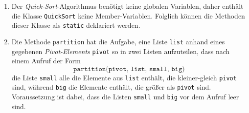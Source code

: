 \begin{enumerate}
\item Der \emph{Quick-Sort}-Algorithmus ben\"otigt keine globalen Variablen,
      daher enth\"alt die Klasse \texttt{QuickSort} keine Member-Variablen.
      Folglich k\"onnen die Methoden dieser Klasse als \texttt{static}
      deklariert werden.
\item Die Methode \texttt{partition} hat die Aufgabe, eine Liste \texttt{list} anhand eines
      gegebenen \emph{Pivot-Elements} \texttt{pivot} so in zwei Listen aufzuteilen, dass nach einem
      Aufruf der Form 
      \[ \texttt{partition(pivot, list, small, big)} \]
      die Liste \texttt{small} alle die Elemente aus 
      \texttt{list} enth\"alt, die kleiner-gleich \texttt{pivot} sind, w\"ahrend \texttt{big}
      die Elemente enth\"alt, die gr\"o{\ss}er als \texttt{pivot} sind.
      Voraussetzung ist dabei, dass die Listen \texttt{small} und \texttt{big} vor dem
      Aufruf leer sind.  


\end{enumerate}
